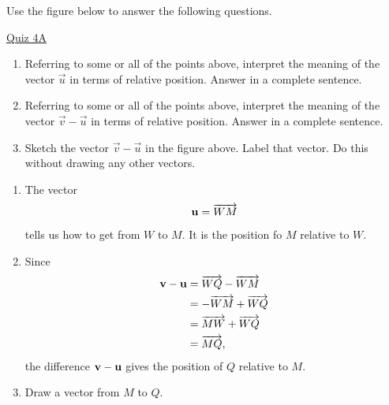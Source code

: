 \documentclass{ximera}
\begin{document}
\begin{question} \label{Mvem30}

Use the figure below to answer the following questions.

\begin{onlineOnly}
    \begin{center}
\end{center}
\end{onlineOnly}

\href{https://www.desmos.com/calculator/8kf9jaq7t0}{Quiz 4A}


\begin{enumerate}
\item Referring to some or all of the points above, interpret the meaning of the vector $\overrightarrow{u}$ in terms of relative position. Answer in a complete sentence.

\item Referring to some or all of the points above, interpret the meaning of the vector $\overrightarrow{v} - \overrightarrow{u}$ in terms of relative position. Answer in a complete sentence.

\item Sketch the vector $\overrightarrow{v} - \overrightarrow{u}$ in the figure above. Label that vector. Do this without drawing any other vectors.
\end{enumerate}

\begin{enumerate}
\item The vector
\[
  {\bf u} = \overrightarrow{WM}
\]
tells us how to get from $W$ to $M$. It is the position fo $M$ relative to $W$.

\item Since
\begin{align*}
  {\bf v} - {\bf u} &= \overrightarrow{WQ} - \overrightarrow{WM} \\
                          &= -\overrightarrow{WM} + \overrightarrow{WQ}  \\
                          &= \overrightarrow{MW} + \overrightarrow{WQ} \\
                          &= \overrightarrow{MQ} ,
\end{align*}
the difference ${\bf v} - {\bf u}$ gives the position of $Q$ relative to $M$.

\item Draw a vector from $M$ to $Q$.
\end{enumerate}
\end{question}
\end{document}

